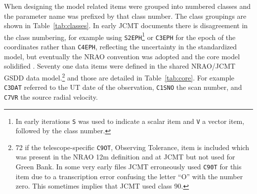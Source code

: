 \documentclass[final,authoryear,5p,times,twocolumn]{elsarticle}
\begin{document}
When designing the model related items were grouped into numbered
classes and the parameter name was prefixed by that class number. The
class groupings are shown in Table~\ref{tab:classes}. In early JCMT
documents \citep[e.g.][]{mtdn1,mtdn84} there is disagreement in the class
numbering, for example using \texttt{S2EPH}\footnote{In early
  iterations \texttt{S} was used to indicate a scalar item and
  \texttt{V} a vector item, followed by the class number.} or \texttt{C3EPH} for the epoch of the
coordinates rather than \texttt{C4EPH}, reflecting the uncertainty in
the standardized model, but eventually \citep[see e.g.][]{mtdn85}
the NRAO convention was adopted and the core model solidified
\citep[][defined the NRAO naming scheme]{tcus5}.
Seventy one data items were defined in the shared NRAO/JCMT GSDD data
model.\footnote{72 if the telescope-specific \texttt{C9OT}, Observing
  Tolerance, item is included which was present in the NRAO 12m
  definition and at JCMT but not used for Green Bank. In some very
  early files JCMT erroneously used \texttt{C90T} for this item due to
  a transcription error confusing the letter ``O'' with the number
  zero. This sometimes implies that JCMT used class 90.} and those are
detailed in Table~\ref{tab:core}. For example \texttt{C3DAT} referred
to the UT date of the observation, \texttt{C1SNO} the scan number,
and \texttt{C7VR} the source radial velocity.
\end{document}
